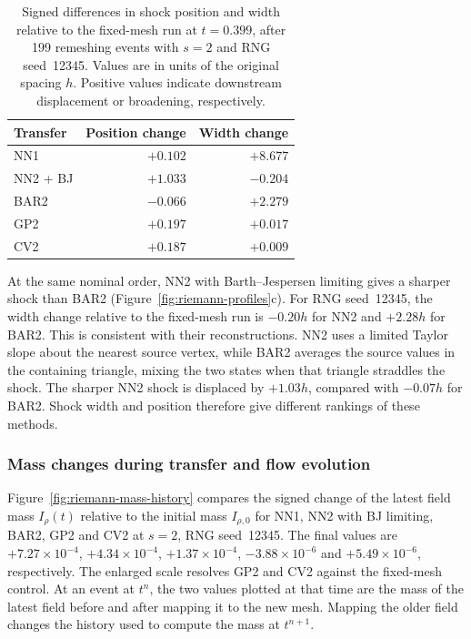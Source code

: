 \documentclass[a4paper,fleqn]{cas-sc}
\begin{document}
\begin{table}[pos=htbp]
\centering\small
\caption{Signed differences in shock position and width relative to the fixed-mesh run at $t=0.399$, after 199 remeshing events with $s=2$ and RNG seed~12345. Values are in units of the original spacing $h$. Positive values indicate downstream displacement or broadening, respectively.}
\label{tab:riemann-shock-metrics}
\begin{tabular}{@{}lrr@{}}
\toprule
Transfer & Position change & Width change\\
\midrule
NN1 & $+0.102$ & $+8.677$\\
NN2 + BJ & $+1.033$ & $-0.204$\\
BAR2 & $-0.066$ & $+2.279$\\
GP2 & $+0.197$ & $+0.017$\\
CV2 & $+0.187$ & $+0.009$\\
\bottomrule
\end{tabular}
\end{table}

At the same nominal order, NN2 with Barth--Jespersen limiting gives a sharper shock than BAR2 (Figure~\ref{fig:riemann-profiles}c). For RNG seed~12345, the width change relative to the fixed-mesh run is $-0.20h$ for NN2 and $+2.28h$ for BAR2. This is consistent with their reconstructions. NN2 uses a limited Taylor slope about the nearest source vertex, while BAR2 averages the source values in the containing triangle, mixing the two states when that triangle straddles the shock. The sharper NN2 shock is displaced by $+1.03h$, compared with $-0.07h$ for BAR2. Shock width and position therefore give different rankings of these methods.

\subsubsection{Mass changes during transfer and flow evolution}
\label{sec:results-local-conservation}

Figure~\ref{fig:riemann-mass-history} compares the signed change of the latest field mass $I_\rho(t)$ relative to the initial mass $I_{\rho,0}$ for NN1, NN2 with BJ limiting, BAR2, GP2 and CV2 at $s=2$, RNG seed~12345. The final values are $+7.27\times10^{-4}$, $+4.34\times10^{-4}$, $+1.37\times10^{-4}$, $-3.88\times10^{-6}$ and $+5.49\times10^{-6}$, respectively. The enlarged scale resolves GP2 and CV2 against the fixed-mesh control. At an event at $t^n$, the two values plotted at that time are the mass of the latest field before and after mapping it to the new mesh. Mapping the older field changes the history used to compute the mass at $t^{n+1}$.
\end{document}
